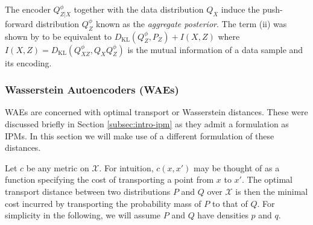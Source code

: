 The encoder $Q^\phi_{Z|X}$ together with the data distribution $Q_X$ induce the push-forward distribution $Q^\phi_Z$ known as the \emph{aggregate posterior}.
The term (ii) was shown by \cite{hoffman2016elbo} to be equivalent to $D_{\text{KL}}(Q^\phi_Z , P_Z) + I(X,Z)$ where $I(X,Z) = D_{\text{KL}}(Q^\phi_{XZ} , Q_XQ^\phi_{Z})$ is the mutual information of a data sample and its encoding.





\subsubsection{Wasserstein Autoencoders (WAEs)}

WAEs \citep{tolstikhin2017wasserstein} are concerned with optimal transport or Wasserstein distances.
These were discussed briefly in Section \ref{subsec:intro-ipm} as they admit a formulation as IPMs. 
In this section we will make use of a different formulation of these distances.

Let $c$ be any metric on $\mathcal{X}$.
For intuition, $c(x, x')$ may be thought of as a function specifying the cost of transporting a point from $x$ to $x'$.
The optimal transport distance between two distributions $P$ and $Q$ over $\mathcal{X}$ is then the minimal cost incurred by transporting the probability mass of $P$ to that of $Q$.
For simplicity in the following, we will assume $P$ and $Q$ have densities $p$ and $q$. 

